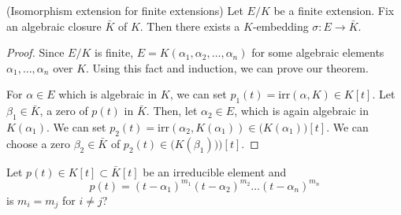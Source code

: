 \vspace{2ex}
\begin{thm}
(Isomorphism extension for finite extensions) Let $E/K$ be a finite extension. Fix an algebraic closure $\bar{K}$ of $K$. Then there exists a $K$-embedding $\sigma :E\rightarrow \bar{K}$. 
\begin{center}
\end{center}
\end{thm}
\vspace{2ex}
\begin{proof}
Since $E/K$ is finite, $E=K(\alpha_1,\alpha_2,\ldots ,\alpha_{n})$ for some algebraic elements $\alpha_1,\ldots ,\alpha_{n}$ over $K$. Using this fact and induction, we can prove our theorem.

\bigskip

For $\alpha \in E$ which is algebraic in $K$, we can set $p_1(t)=\mathrm{irr}(\alpha ,K)\in K[t]$. Let $\beta_1\in \bar{K}$, a zero of $p(t)$ in $\bar{K}$. Then, let $\alpha_2\in E$, which is again algebraic in $K(\alpha _1)$. We can set $p_2(t)=\mathrm{irr}(\alpha_2,K(\alpha_1))\in \big(K(\alpha_1)\big)[t]$. We can choose a zero $\beta_2\in  \bar{K}$ of $p_2(t)\in \big(K(\beta_1))\big)[t]$.  
\end{proof}
\vspace{2ex}
\begin{rmk}
Let $p(t)\in K[t]\subset \bar{K}[t]$ be an irreducible element and 
\[p(t)=(t-\alpha_1)^{m_1}(t-\alpha_2)^{m_2}\ldots (t-\alpha _{n})^{m_{n}}\]
is $m_{i}=m_{j}$ for $i\ne j$?
\end{rmk}
\vspace{2ex}


